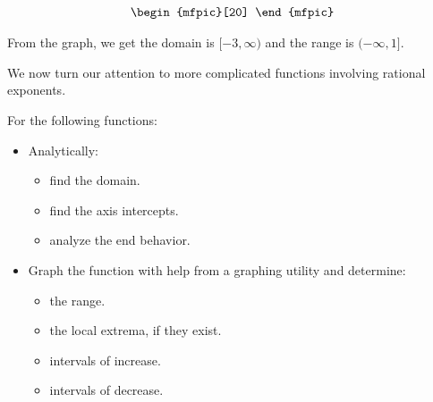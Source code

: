 \begin{ex}
\begin{enumerate}
\[\begin{array}[v]{rlc}
\begin{mfpic}[20]{-4}{2}{-3}{2}
\end{mfpic} \\
 
 \end{array} \]

From the graph, we get the domain is $[-3, \infty)$ and the range is $(-\infty, 1]$.

\end{enumerate}

\end{ex}

We now turn our attention to more complicated functions involving rational exponents.

\begin{ex}  For the following functions:

\begin{itemize}

\item Analytically:

\begin{multicols}{2}

\begin{itemize}

\item find the domain.

\item find the axis intercepts.

\item analyze the end behavior.

\end{itemize}

\end{multicols}


\item Graph the function with help from a graphing utility and determine:

\begin{itemize}

\item  the range.

\item the local extrema, if they exist.

\end{itemize}

\begin{itemize}

\item intervals of increase.

\item intervals of decrease.


\end{itemize}
\end{itemize}
\end{ex}
